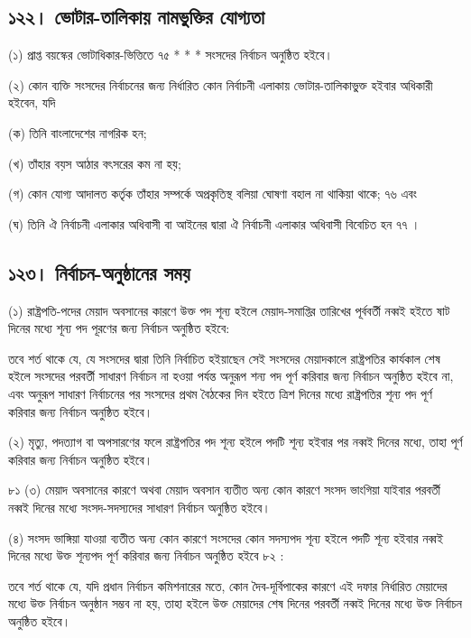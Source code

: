 \documentclass[11pt]{article}
\begin{document}
\subsection{১২২। ভোটার-তালিকায় নামভুক্তির যোগ্যতা}
\label{sec:orgdb46c71}
(১) প্রাপ্ত বয়স্কের ভোটাধিকার-ভিত্তিতে ৭৫ * * * সংসদের নির্বাচন অনুষ্ঠিত
    হইবে।

(২) কোন ব্যক্তি সংসদের নির্বাচনের জন্য নির্ধারিত কোন নির্বাচনী এলাকায়
    ভোটার-তালিকাভু্ক্ত হইবার অধিকারী হইবেন, যদি

(ক) তিনি বাংলাদেশের নাগরিক হন;

(খ) তাঁহার বয়স আঠার বৎসরের কম না হয়;

(গ) কোন যোগ্য আদালত কর্তৃক তাঁহার সম্পর্কে অপ্রকৃতিস্থ বলিয়া ঘোষণা বহাল না
    থাকিয়া থাকে; ৭৬ এবং

(ঘ) তিনি ঐ নির্বাচনী এলাকার অধিবাসী বা আইনের দ্বারা ঐ নির্বাচনী এলাকার
    অধিবাসী বিবেচিত হন ৭৭ ।

\subsection{১২৩। নির্বাচন-অনুষ্ঠানের সময়}
\label{sec:org1210914}
(১) রাষ্ট্রপতি-পদের মেয়াদ অবসানের কারণে উক্ত পদ শূন্য হইলে মেয়াদ-সমাপ্তির
    তারিখের পূর্ববর্তী নব্বই হইতে ষাট দিনের মধ্যে শূন্য পদ পূরণের জন্য নির্বাচন
    অনুষ্ঠিত হইবে:

তবে শর্ত থাকে যে, যে সংসদের দ্বারা তিনি নির্বাচিত হইয়াছেন সেই সংসদের
মেয়াদকালে রাষ্ট্রপতির কার্যকাল শেষ হইলে সংসদের পরবর্তী সাধারণ নির্বাচন না
হওয়া পর্যন্ত অনুরূপ শন্য পদ পূর্ণ করিবার জন্য নির্বাচন অনুষ্ঠিত হইবে না, এবং অনুরূপ
সাধারণ নির্বাচনের পর সংসদের প্রথম বৈঠকের দিন হইতে ত্রিশ দিনের মধ্যে
রাষ্ট্রপতির শূন্য পদ পূর্ণ করিবার জন্য নির্বাচন অনুষ্ঠিত হইবে।

(২) মৃত্যু, পদত্যাগ বা অপসারণের ফলে রাষ্ট্রপতির পদ শূন্য হইলে পদটি শূন্য হইবার
    পর নব্বই দিনের মধ্যে, তাহা পূর্ণ করিবার জন্য নির্বাচন অনুষ্ঠিত হইবে।

৮১ (৩) মেয়াদ অবসানের কারণে অথবা মেয়াদ অবসান ব্যতীত অন্য কোন কারণে সংসদ
ভাংগিয়া যাইবার পরবর্তী নব্বই দিনের মধ্যে সংসদ-সদস্যদের সাধারণ নির্বাচন
অনুষ্ঠিত হইবে।

(৪) সংসদ ভাঙ্গিয়া যাওয়া ব্যতীত অন্য কোন কারণে সংসদের কোন সদস্যপদ শূন্য হইলে
    পদটি শূন্য হইবার নব্বই দিনের মধ্যে উক্ত শূন্যপদ পূর্ণ করিবার জন্য নির্বাচন অনুষ্ঠিত
    হইবে ৮২ :

তবে শর্ত থাকে যে, যদি প্রধান নির্বাচন কমিশনারের মতে, কোন দৈব-দূর্বিপাকের
কারণে এই দফার নির্ধারিত মেয়াদের মধ্যে উক্ত নির্বাচন অনুষ্ঠান সম্ভব না হয়,
তাহা হইলে উক্ত মেয়াদের শেষ দিনের পরবর্তী নব্বই দিনের মধ্যে উক্ত নির্বাচন
অনুষ্ঠিত হইবে।
\end{document}
